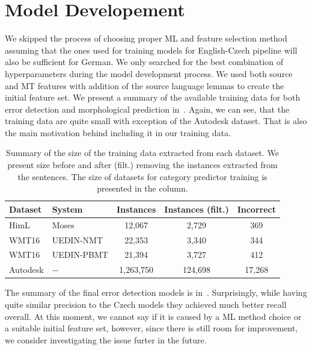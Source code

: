 \section{Model Developement}

We skipped the process of choosing proper ML and feature selection method
assuming that the ones used for training models for English-Czech pipeline will
also be sufficient for German. We only searched for the best combination
of hyperparameters during the model development process. We used both source
and MT features with addition of the source language lemmas to create the initial feature set.
We present a summary
of the available training data for both error detection and morphological prediction in~.
Again, we can see, that the training data are quite small with exception of the Autodesk
dataset. That is also the main motivation behind including it in our training data.

\begin{table}[t]
\centering
\small

\begin{tabular}{ll|ccc}
Dataset  &  System &  \hash{} Instances  &  \hash{} Instances (filt.)  &  \hash{} Incorrect  \\
\hline
HimL  &  Moses  & 12,067  &  2,729  &  369  \\
WMT16  &  UEDIN-NMT  &  22,353  &  3,340  &  344  \\
WMT16  &  UEDIN-PBMT  &  21,394  &   3,727  &  412  \\
Autodesk  &  $-$  &  1,263,750  &  124,698  &  17,268  \\
\end{tabular}
\caption[Summary of the extracted German training data]{
    Summary of the size of the training data extracted from each dataset. We present
size before and after (filt.) removing the instances extracted from the  sentences.
The size of datasets for category predictor training is presented in the  column.
}
\label{wf-cat-data-sum}
\end{table}

The summary of the final error detection models is in~. Surprisingly,
while having quite similar precision to the Czech models they achieved much better
recall overall. At this moment, we cannot say if it is caused by a ML method choice or a suitable
initial feature set, however, since there is still room for improvement, we consider investigating
the issue furter in the future.


